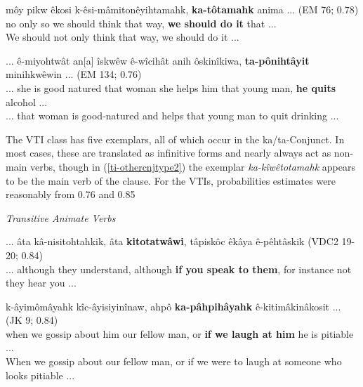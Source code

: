     \begin{exe}
    \ex
    \gll môy pikw êkosi k-êsi-mâmitonêyihtamahk, \textbf{ka-tôtamahk} anima ... \tiny{(EM 76; 0.78)} \\
    no only so {we should think that way}, {\textbf{we should do it}} that ... \\
    \trans We should not only think that way, we should do it ... \tiny{\citep[48-49]{Minde1997kwayask}}
    \label{ti-othercnjtype4}
    \end{exe}
    
    \begin{exe}
    \ex
    \gll ... ê-miyohtwât an[a] îskwêw ê-wîcihât anih ôskinîkiwa, \textbf{ta-pônihtâyit} minihkwêwin ... \tiny{(EM 134; 0.76)}\\
    ... {she is good  natured} that woman {she helps him} that {young man}, {\textbf{he quits}} {alcohol} ...\\
    \trans ... that woman is good-natured and helps that young man to quit drinking ... \tiny{\citep[92-93]{Minde1997kwayask}}
    \label{ti-othercnjtype5}
    \end{exe}
    
The VTI class has five exemplars, all of which occur in the ka/ta-Conjunct. In most cases, these are translated as infinitive forms and nearly always act as non-main verbs, though in (\ref{ti-othercnjtype2}) the exemplar \textit{ka-kîwêtotamahk} appears to be the main verb of the clause. For the VTIs, probabilities estimates were reasonably from 0.76 and 0.85
    
\vspace{5mm}
\textit{Transitive Animate Verbs}

    \begin{exe}
    \ex
    \gll ... âta kâ-nisitohtahkik, âta \textbf{kitotatwâwi}, tâpiskôc êkâya ê-pêhtâskik \tiny{(VDC2 19-20; 0.84)}\\
    ... although {they understand}, although {\textbf{if you speak to them}}, {for instance} not {they hear you} ... \\
    \trans 
    \label{ta-othercnjtype1}
    \end{exe}
    
    \begin{exe}
    \ex
    \gll k-âyimômâyahk kîc-âyisiyinînaw, ahpô \textbf{ka-pâhpihâyahk} ê-kitimâkinâkosit ... \tiny{(JK 9; 0.84)} \\
    {when we gossip about him} {our fellow man}, or {\textbf{if we laugh at him}} {he is pitiable} ...  \\
    \trans When we gossip about our fellow man, or if we were to laugh at someone who looks pitiable ... \tiny{\citep[54-55]{KaNipitehtew1998}}
    \label{ta-othercnjtype2}
    \end{exe}
    
